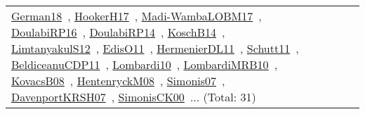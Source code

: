 {\begin{longtable}{lp{3cm}>{\raggedright\arraybackslash}p{6cm}>{\raggedright\arraybackslash}p{6cm}>{\raggedright\arraybackslash}p{8cm}}
\href{../works/German18.pdf}{German18}~\cite{German18}, \href{../works/HookerH17.pdf}{HookerH17}~\cite{HookerH17}, \href{../works/Madi-WambaLOBM17.pdf}{Madi-WambaLOBM17}~\cite{Madi-WambaLOBM17}, \href{../works/DoulabiRP16.pdf}{DoulabiRP16}~\cite{DoulabiRP16}, \href{../works/DoulabiRP14.pdf}{DoulabiRP14}~\cite{DoulabiRP14}, \href{../works/KoschB14.pdf}{KoschB14}~\cite{KoschB14}, \href{../works/LimtanyakulS12.pdf}{LimtanyakulS12}~\cite{LimtanyakulS12}, \href{../works/EdisO11.pdf}{EdisO11}~\cite{EdisO11}, \href{../works/HermenierDL11.pdf}{HermenierDL11}~\cite{HermenierDL11}, \href{../works/Schutt11.pdf}{Schutt11}~\cite{Schutt11}, \href{../works/BeldiceanuCDP11.pdf}{BeldiceanuCDP11}~\cite{BeldiceanuCDP11}, \href{../works/Lombardi10.pdf}{Lombardi10}~\cite{Lombardi10}, \href{../works/LombardiMRB10.pdf}{LombardiMRB10}~\cite{LombardiMRB10}, \href{../works/KovacsB08.pdf}{KovacsB08}~\cite{KovacsB08}, \href{../works/HentenryckM08.pdf}{HentenryckM08}~\cite{HentenryckM08}, \href{../works/Simonis07.pdf}{Simonis07}~\cite{Simonis07}, \href{../works/DavenportKRSH07.pdf}{DavenportKRSH07}~\cite{DavenportKRSH07}, \href{../works/SimonisCK00.pdf}{SimonisCK00}~\cite{SimonisCK00}... (Total: 31)\\

\end{longtable}}
